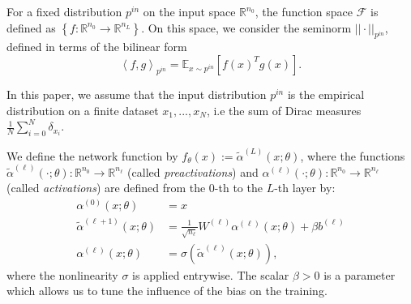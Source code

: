 \documentclass{article}
\begin{document}
For a fixed distribution $p^{in}$ on the input space $\mathbb{R}^{n_0}$, the function space $\mathcal{F}$ is defined as $\left\{ f : \mathbb{R}^{n_0} \to \mathbb{R}^{n_L} \right\} $. On this space, we consider the seminorm $|| \cdot ||_{p^{in}} $, defined in terms of the bilinear form
$$
\left<f, g\right>_{p^{in}} = \mathbb{E}_{x \sim p^{in}}\left[ f(x)^T g(x) \right].
$$

In this paper, we assume that the input distribution $p^{in}$ is the empirical distribution on a finite dataset $x_1, ..., x_N$, i.e the sum of Dirac measures $ \frac{1}{N} \sum_{i=0}^N \delta_{x_i}$. 

We define the network function by $f_\theta(x) := \tilde{\alpha}^{(L)}(x; \theta)$, where the functions $\tilde{\alpha}^{(\ell)}(\cdot; \theta) : \mathbb{R}^{n_0} \to\mathbb{R}^{n_\ell}$ (called \emph{preactivations}) and $\alpha^{(\ell)}(\cdot; \theta):\mathbb{R}^{n_0} \to\mathbb{R}^{n_\ell}$ (called \emph{activations}) are defined from the $0$-th to the $L$-th layer by:
\begin{align*}
    \alpha^{(0)}(x; \theta) &= x \\
    \tilde{\alpha}^{(\ell+1)}(x; \theta) &= \frac{1}{\sqrt{n_\ell}}W^{(\ell)} \alpha^{(\ell)}(x; \theta) + \beta b^{(\ell)} \\
    \alpha^{(\ell)}(x; \theta) &= \sigma(\tilde{\alpha}^{(\ell)}(x; \theta)),
\end{align*}
where the nonlinearity $\sigma$ is applied entrywise. The scalar $\beta > 0$ is a parameter which allows us to tune the influence of the bias on the training.
\end{document}
